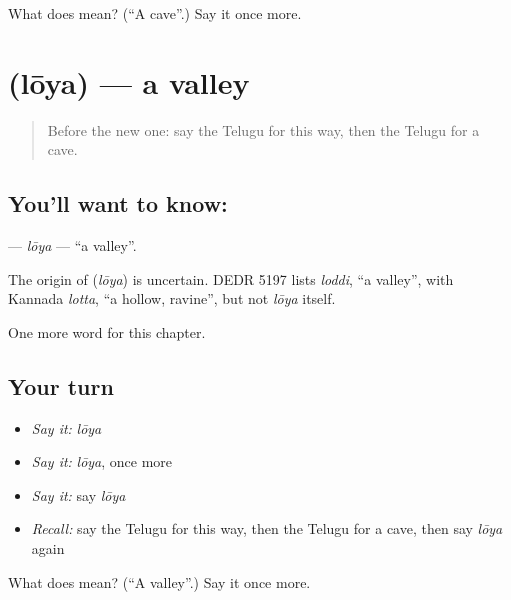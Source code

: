 \begin{tcolorbox}[breakable,colback=teal!4,colframe=teal!35!black,title={Before you move on}]
What does  mean? (\textquotedblleft{}A cave\textquotedblright{}.) Say it once more.
\end{tcolorbox}
\section[\texorpdfstring{\te{లోయ} (lōya)}{లోయ (lōya)}]{ (lōya) — a valley}

\label{lesson:TE-C174-loya}



\begin{quote}
Before the new one: say the Telugu for this way, then the Telugu for a cave.
\end{quote}

\subsection*{You'll want to know: }
\textbf{} — \emph{lōya} — \textquotedblleft{}a valley\textquotedblright{}.

\begin{cousinweb}
The origin of \textbf{} (\emph{lōya}) is uncertain. DEDR 5197 lists \emph{loddi}, \textquotedblleft{}a valley\textquotedblright{}, with Kannada \emph{lotta}, \textquotedblleft{}a hollow, ravine\textquotedblright{}, but not \emph{lōya} itself.
\end{cousinweb}

\begin{grammarlens}[title={What you've built}]
One more word for this chapter.
\end{grammarlens}

\subsection*{Your turn}
\begin{itemize}
\raggedright
  \item \emph{Say it:} \emph{lōya}
  \item \emph{Say it:} \emph{lōya}, once more
  \item \emph{Say it:} say \emph{lōya}
  \item \emph{Recall:} say the Telugu for this way, then the Telugu for a cave, then say \emph{lōya} again
\end{itemize}

\begin{tcolorbox}[breakable,colback=teal!4,colframe=teal!35!black,title={Before you move on}]
What does  mean? (\textquotedblleft{}A valley\textquotedblright{}.) Say it once more.
\end{tcolorbox}
